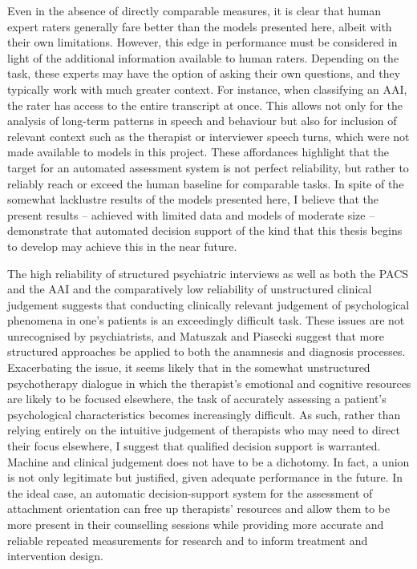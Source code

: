\documentclass[12pt]{report}
\begin{document}
Even in the absence of directly comparable measures, it is clear that human expert raters generally fare better than the models presented here, albeit with their own limitations.
However, this edge in performance must be considered in light of the additional information available to human raters.
Depending on the task, these experts may have the option of asking their own questions, and they typically work with much greater context.
For instance, when classifying an AAI, the rater has access to the entire transcript at once.
This allows not only for the analysis of long-term patterns in speech and behaviour but also for inclusion of relevant context such as the therapist or interviewer speech turns, which were not made available to models in this project.
These affordances highlight that the target for an automated assessment system is not perfect reliability, but rather to reliably reach or exceed the human baseline for comparable tasks.
In spite of the somewhat lacklustre results of the models presented here, I believe that the present results -- achieved with limited data and models of moderate size -- demonstrate that automated decision support of the kind that this thesis begins to develop may achieve this in the near future.

The high reliability of structured psychiatric interviews as well as both the PACS and the AAI and the comparatively low reliability of unstructured clinical judgement suggests that conducting clinically relevant judgement of psychological phenomena in one's patients is an exceedingly difficult task.
These issues are not unrecognised by psychiatrists, and Matuszak and Piasecki \citeyear{Matuszak2012} suggest that more structured approaches be applied to both the anamnesis and diagnosis processes.
Exacerbating the issue, it seems likely that in the somewhat unstructured psychotherapy dialogue in which the therapist's emotional and cognitive resources are likely to be focused elsewhere, the task of accurately assessing a patient's psychological characteristics becomes increasingly difficult.
As such, rather than relying entirely on the intuitive judgement of therapists who may need to direct their focus elsewhere, I suggest that qualified decision support is warranted.
Machine and clinical judgement does not have to be a dichotomy.
In fact, a union is not only legitimate but justified, given adequate performance in the future.
In the ideal case, an automatic decision-support system for the assessment of attachment orientation can free up therapists' resources and allow them to be more present in their counselling sessions while providing more accurate and reliable repeated measurements for research and to inform treatment and intervention design.
\end{document}
